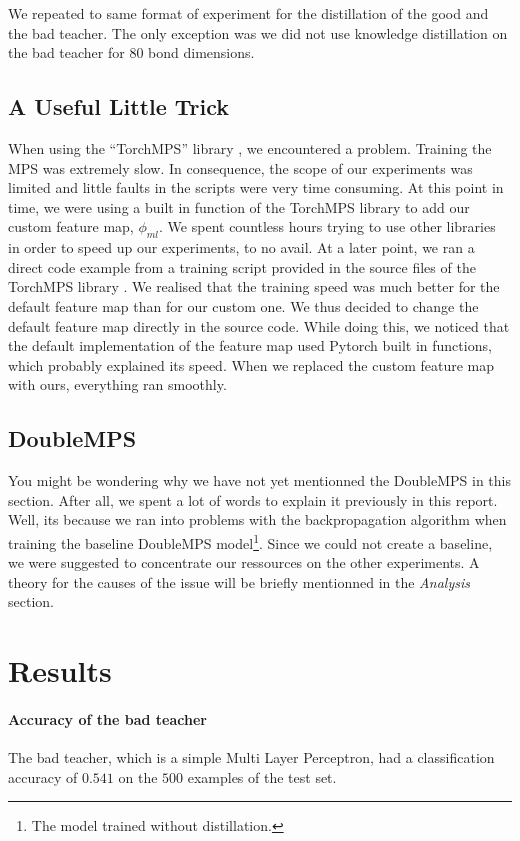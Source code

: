 \documentclass{article}
\theoremstyle{definition}
\theoremstyle{definition}
\begin{document}
We repeated to same format of experiment for the distillation of the good and the bad teacher. The only exception was we did not use knowledge distillation on the bad teacher for $80$ bond dimensions.

\subsection{A Useful Little Trick}
When using the \enquote{TorchMPS} library \cite{torchmps}, we encountered a problem. Training the MPS was extremely slow. In consequence, the scope of our experiments was limited and little faults in the scripts were very time consuming. At this point in time, we were using a built in function of the TorchMPS library to add our custom feature map, $\phi_{ml}$. We spent countless hours trying to use other libraries in order to speed up our experiments, to no avail. At a later point, we ran a direct code example from a training script provided in the source files of the TorchMPS library \cite{torchmps}. We realised that the training speed was much better for the default feature map than for our custom one. We thus decided to change the default feature map directly in the source code. While doing this, we noticed that the default implementation of the feature map used Pytorch built in functions, which probably explained its speed. When we replaced the custom feature map with ours, everything ran smoothly.


\subsection{DoubleMPS}
You might be wondering why we have not yet mentionned the DoubleMPS in this section. After all, we spent a lot of words to explain it previously in this report. Well, its because we ran into problems with the backpropagation algorithm when training the baseline DoubleMPS model\footnote{The model trained without distillation.}. Since we could not create a baseline, we were suggested to concentrate our ressources on the other experiments. A theory for the causes of the issue will be briefly mentionned in the \emph{Analysis} section. 


\section{Results}
\paragraph{Accuracy of the bad teacher}
The bad teacher, which is a simple Multi Layer Perceptron, had a classification accuracy of $0.541$ on the $500$ examples of the test set.
\end{document}
